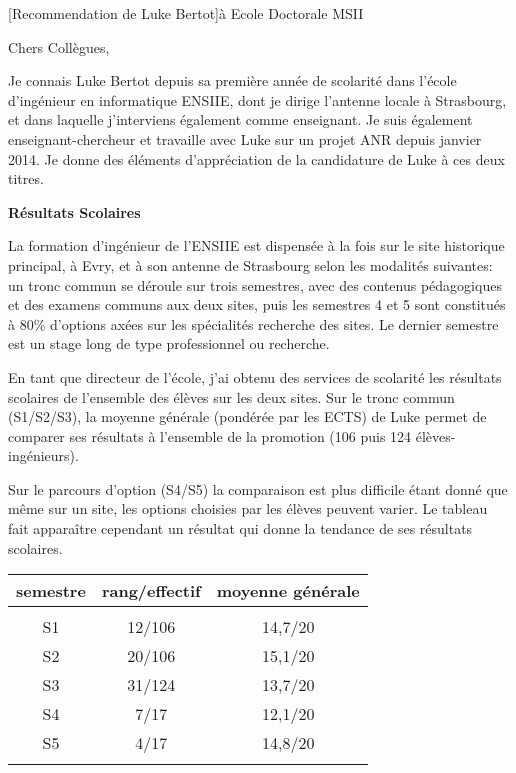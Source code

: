 \documentclass[a4paper,10pt]{article}
\begin{document}

\begin{letter}[Recommendation de Luke Bertot]{à}%
{Ecole Doctorale MSII}


Chers Collègues,

Je  connais Luke  Bertot  depuis sa  première année  de  scolarité dans  l'école
d'ingénieur  en  informatique   ENSIIE,  dont  je  dirige   l'antenne  locale  à
Strasbourg, et dans laquelle j'interviens également comme enseignant. Je suis
également enseignant-chercheur et travaille avec Luke sur un projet ANR depuis
janvier 2014. Je donne des éléments d'appréciation de la candidature de Luke
à ces deux titres.

\textbf{Résultats Scolaires}

La formation d'ingénieur de l'ENSIIE est dispensée à la fois sur le site
historique principal, à Evry, et à son antenne de Strasbourg selon les modalités
suivantes: un tronc commun se déroule sur trois semestres, avec des contenus 
pédagogiques et des examens communs aux deux sites, puis les semestres 4 et 5
sont constitués à 80\% d'options axées sur les spécialités recherche des sites.
Le dernier semestre est un stage long de type professionnel ou recherche. 

En tant  que directeur  de l'école,  j'ai obtenu des  services de  scolarité les
résultats scolaires  de l'ensemble des élèves  sur les deux sites.  Sur le tronc
commun (S1/S2/S3), la moyenne générale (pondérée par les ECTS) de Luke permet de
comparer   ses  résultats   à  l'ensemble   de  la   promotion  (106   puis  124
élèves-ingénieurs).

Sur le parcours  d'option (S4/S5) la comparaison est plus  difficile étant donné
que même  sur un site,  les options choisies par  les élèves peuvent  varier. Le
tableau fait apparaître cependant un résultat qui donne la tendance de ses
résultats scolaires.

\begin{center}
\begin{tabular}{ccc}
semestre & rang/effectif & moyenne générale\\
\hline \\
S1 & 12/106 & 14,7/20\\
S2 & 20/106 & 15,1/20\\
S3 & 31/124 & 13,7/20\\
S4 & 7/17   & 12,1/20\\
S5 & 4/17   & 14,8/20\\
\hline \\
\end{tabular}
\end{center}


\end{letter}
\end{document}
